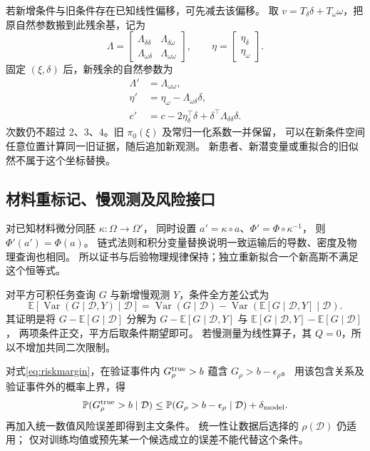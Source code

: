 \documentclass[11pt,a4paper]{article}
\numberwithin{equation}{section}
\theoremstyle{definition}
\newcommand{\E}{\mathbb E}
\newcommand{\Prob}{\mathbb P}
\newcommand{\D}{\mathcal D}
\DeclareMathOperator{\Var}{Var}
\begin{document}
若新增条件与旧条件存在已知线性偏移，可先减去该偏移。
取 \(v=T_\delta\delta+T_\omega\omega\)，把原自然参数搬到此残余基，记为
\[
 \Lambda=\begin{bmatrix}\Lambda_{\delta\delta}&\Lambda_{\delta\omega}\\
 \Lambda_{\omega\delta}&\Lambda_{\omega\omega}\end{bmatrix},
 \qquad \eta=\begin{bmatrix}\eta_\delta\\\eta_\omega\end{bmatrix}.
\]
固定 \((\xi,\delta)\) 后，新残余的自然参数为
\begin{align}
 \Lambda'&=\Lambda_{\omega\omega},\\
 \eta'&=\eta_\omega-\Lambda_{\omega\delta}\delta,\\
 c'&=c-2\eta_\delta^\top\delta+
           \delta^\top\Lambda_{\delta\delta}\delta .
 \label{eq:naturalupgrade}
\end{align}
次数仍不超过 2、3、4。旧 \(\pi_0(\xi)\) 及常归一化系数一并保留，
可以在新条件空间任意位置计算同一旧证据，随后追加新观测。
新患者、新潜变量或重拟合的旧似然不属于这个坐标替换。

\subsection{材料重标记、慢观测及风险接口}
对已知材料微分同胚 \(\kappa:\Omega\to\Omega'\)，
同时设置 \(a'=\kappa\circ a\)、\(\Phi'=\Phi\circ\kappa^{-1}\)，
则 \(\Phi'(a')=\Phi(a)\)。
链式法则和积分变量替换说明一致运输后的导数、密度及物理查询也相同。
所以证书与后验物理规律保持；独立重新拟合一个新高斯不满足这个恒等式。

对平方可积任务查询 \(G\) 与新增慢观测 \(Y\)，条件全方差公式为
\begin{equation}
 \E\!\left[\Var(G\mid\D,Y)\mid\D\right]
 =\Var(G\mid\D)-\Var\!\left(\E[G\mid\D,Y]\mid\D\right).
 \label{eq:slowvalue}
\end{equation}
其证明是将
\(G-\E[G\mid\D]\) 分解为
\(G-\E[G\mid\D,Y]\) 与 \(\E[G\mid\D,Y]-\E[G\mid\D]\)，
两项条件正交，平方后取条件期望即可。
若慢测量为线性算子，其 \(Q=0\)，所以不增加共同二次限制。

对式\eqref{eq:riskmargin}，在验证事件内
\(G^{\rm true}_\rho>b\) 蕴含 \(G_\rho>b-\epsilon_\rho\)。
用该包含关系及验证事件外的概率上界，得
\[
 \Prob(G^{\rm true}_\rho>b\mid\D)
 \le\Prob(G_\rho>b-\epsilon_\rho\mid\D)+\delta_{\rm model}.
\]
再加入统一数值风险误差即得到主文条件。
统一性让数据后选择的 \(\rho(\D)\) 仍适用；
仅对训练均值或预先某一个候选成立的误差不能代替这个条件。
\end{document}

